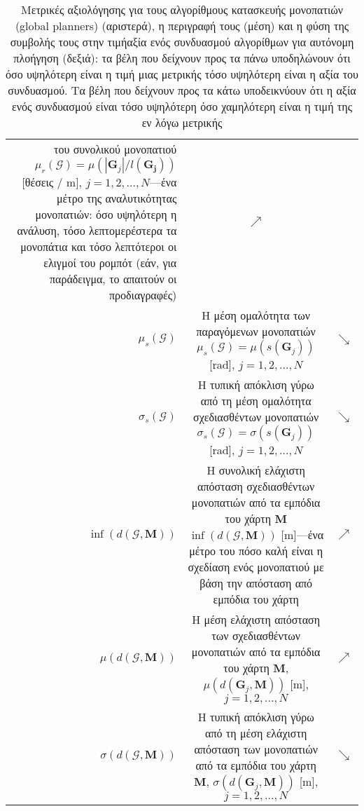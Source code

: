 \begin{table}
\begin{tabular}{rcc}
\begin{minipage}[t]{0.7\columnwidth}
      του συνολικού μονοπατιού
      $\mu_r(\bm{\mathcal{G}}) = \mu(|\bm{G}_j| / l(\bm{\bm{G}_j}))$
      [θέσεις / m], $j = 1,2,\dots,N$---ένα μέτρο της αναλυτικότητας μονοπατιών:
      όσο υψηλότερη η ανάλυση, τόσο λεπτομερέστερα τα μονοπάτια και τόσο
      λεπτότεροι οι ελιγμοί του ρομπότ (εάν, για παράδειγμα, το απαιτούν οι
      προδιαγραφές)
    \end{minipage} & $\nearrow$ \\
    $\mu_{s}(\bm{\mathcal{G}})$ &
    \begin{minipage}[t]{0.7\columnwidth}%
      Η μέση ομαλότητα των παραγόμενων μονοπατιών
      $\mu_s(\bm{\mathcal{G}}) = \mu(s(\bm{G}_j))$ [rad], $j = 1,2,\dots,N$
    \end{minipage} &
    $\searrow$ \\
    $\sigma_{s}(\bm{\mathcal{G}})$ &
    \begin{minipage}[t]{0.7\columnwidth}%
      Η τυπική απόκλιση γύρω από τη μέση ομαλότητα σχεδιασθέντων μονοπατιών
      $\sigma_s(\bm{\mathcal{G}}) = \sigma(s(\bm{G}_j))$ [rad], $j = 1,2,\dots,N$
    \end{minipage} & $\searrow$ \\
    $\inf(d(\bm{\mathcal{G}},\bm{M}))$ &
    \begin{minipage}[t]{0.7\columnwidth}%
      Η συνολική ελάχιστη απόσταση σχεδιασθέντων μονοπατιών από τα εμπόδια του
      χάρτη $\bm{M}$
      $\inf(d(\bm{\mathcal{G}},\bm{M}))$ [m]---ένα μέτρο του πόσο καλή είναι
      η σχεδίαση ενός μονοπατιού με βάση την απόσταση από εμπόδια του χάρτη
    \end{minipage} & $\nearrow$ \\
    $\mu(d(\bm{\mathcal{G}}, \bm{M}))$ &
    \begin{minipage}[t]{0.7\columnwidth}%
      Η μέση ελάχιστη απόσταση των σχεδιασθέντων μονοπατιών από τα εμπόδια του
      χάρτη $\bm{M}$, $\mu(d(\bm{G}_j,\bm{M}))$ [m], $j = 1,2,\dots,N$
    \end{minipage} & $\nearrow$ \\
    $\sigma(d(\bm{\mathcal{G}},\bm{M}))$ &
    \begin{minipage}[t]{0.7\columnwidth}%
      Η τυπική απόκλιση γύρω από τη μέση ελάχιστη απόσταση των μονοπατιών
      από τα εμπόδια του χάρτη $\bm{M}$, $\sigma(d(\bm{G}_j,\bm{M}))$ [m],
      $j = 1,2,\dots,N$
    \end{minipage} & $\searrow$ \\ \bottomrule
  \end{tabular}
  \caption{\small Μετρικές αξιολόγησης για τους αλγορίθμους κατασκευής μονοπατιών
           (global planners) (αριστερά), η περιγραφή τους (μέση) και η φύση
           της συμβολής τους στην τιμήαξία ενός συνδυασμού αλγορίθμων για
           αυτόνομη πλοήγηση (δεξιά): τα βέλη που δείχνουν προς τα πάνω
           υποδηλώνουν ότι όσο υψηλότερη είναι η τιμή μιας μετρικής τόσο
           υψηλότερη είναι η αξία του συνδυασμού. Tα βέλη που δείχνουν προς τα
           κάτω υποδεικνύουν ότι η αξία ενός συνδυασμού είναι τόσο υψηλότερη
           όσο χαμηλότερη είναι η τιμή της εν λόγω μετρικής}
  \label{tbl:metrics_and_proportionality_global_planners}
\end{table}

